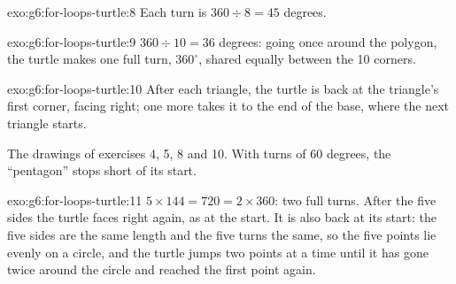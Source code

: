 \begin{solution}{exo:g6:for-loops-turtle:8}
Each turn is $360 \div 8 = 45$ degrees.

\label{lst:g6:for-loops-turtle:sol-octagon}
\end{solution}

\begin{solution}{exo:g6:for-loops-turtle:9}
$360 \div 10 = 36$ degrees: going once around the polygon, the turtle makes one
full turn, $360^\circ$, shared equally between the 10 corners.
\end{solution}

\begin{solution}{exo:g6:for-loops-turtle:10}
After each triangle, the turtle is back at the triangle's first corner, facing
right; one more  takes it to the end of the base, where the
next triangle starts.

\label{lst:g6:for-loops-turtle:sol-triangles}

\begin{omfigure}

{\small The drawings of exercises 4, 5, 8 and 10. With turns of 60 degrees,
the ``pentagon'' stops short of its start.}
\end{omfigure}
\end{solution}

\begin{solution}{exo:g6:for-loops-turtle:11}
$5 \times 144 = 720 = 2 \times 360$: two full turns. After the five sides the
turtle faces right again, as at the start. It is also back at its start: the
five sides are the same length and the five turns the same, so the five points
lie evenly on a circle, and the turtle jumps two points at a time until it has
gone twice around the circle and reached the first point again.
\end{solution}

